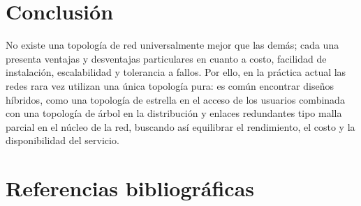 \documentclass[12pt,letterpaper]{article}
\begin{document}
\section{Conclusión}

No existe una topología de red universalmente mejor que las demás; cada una presenta ventajas y desventajas particulares en cuanto a costo, facilidad de instalación, escalabilidad y tolerancia a fallos. Por ello, en la práctica actual las redes rara vez utilizan una única topología pura: es común encontrar diseños híbridos, como una topología de estrella en el acceso de los usuarios combinada con una topología de árbol en la distribución y enlaces redundantes tipo malla parcial en el núcleo de la red, buscando así equilibrar el rendimiento, el costo y la disponibilidad del servicio.

\newpage
\section*{Referencias bibliográficas}
\end{document}
